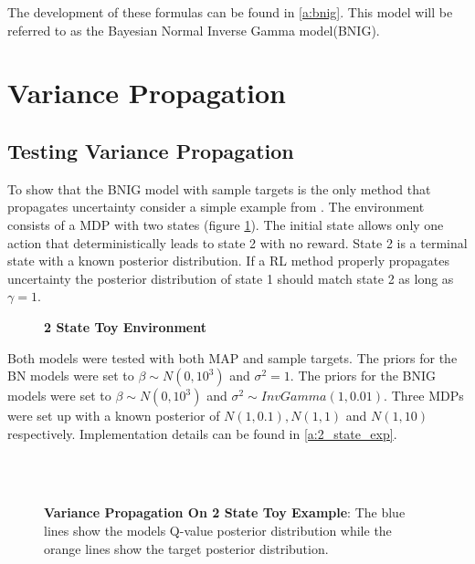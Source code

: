 The development of these formulas can be found in \ref{a:bnig}. This model will be referred to as the Bayesian Normal Inverse Gamma model(BNIG).

\section{Variance Propagation}

\subsection{Testing Variance Propagation}

To show that the BNIG model with sample targets is the only method that propagates uncertainty consider a simple example from \cite{osband_2018}. The environment consists of a MDP with two states (figure \ref{fig:2state}). The initial state allows only one action that deterministically leads to state 2 with no reward. State 2 is a terminal state with a known posterior distribution. If a RL method properly propagates uncertainty the posterior distribution of state 1 should match state 2 as long as $\gamma=1$. 

\begin{figure}[H]
    \centering
    \caption{\textbf{2 State Toy Environment}}
    \label{fig:2state}
\end{figure}

Both models were tested with both MAP and sample targets. The priors for the BN models were set to $\beta \sim N(0,10^3)$ and $\sigma^2 = 1$. The priors for the BNIG models were set to $\beta \sim N(0,10^3)$ and $\sigma^2 \sim InvGamma(1, 0.01)$. Three MDPs were set up with a known posterior of $N(1, 0.1), N(1, 1)$ and $N(1, 10)$ respectively. Implementation details can be found in \ref{a:2_state_exp}.

\begin{figure}[H]
    \centering
    \\
    \\
    \caption{\textbf{Variance Propagation On 2 State Toy Example}: The blue lines show the models Q-value posterior distribution while the orange lines show the target posterior distribution.}
    \label{fig:proptest}
\end{figure}

